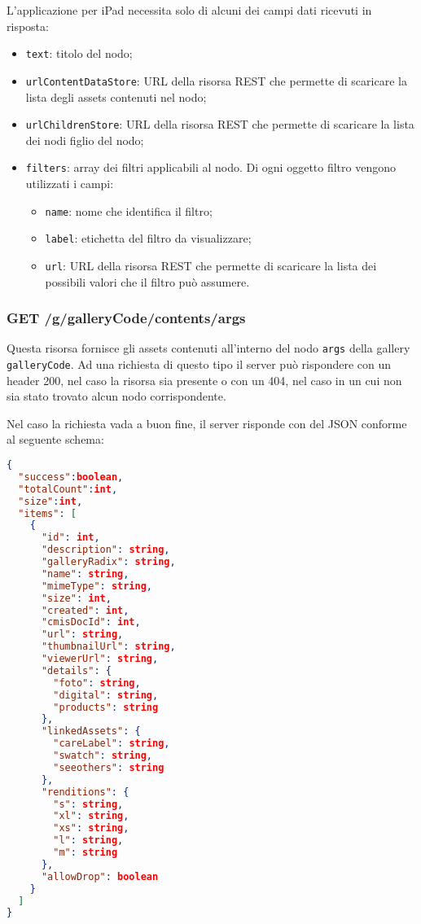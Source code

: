 L'applicazione per iPad necessita solo di alcuni dei campi dati ricevuti in risposta:
\begin{itemize}
\item \texttt{text}: titolo del nodo;
\item \texttt{urlContentDataStore}: URL della risorsa REST che permette di scaricare la lista degli assets contenuti nel nodo;
\item \texttt{urlChildrenStore}: URL della risorsa REST che permette di scaricare la lista dei nodi figlio del nodo;
\item \texttt{filters}: array dei filtri applicabili al nodo. Di ogni oggetto filtro vengono utilizzati i campi:
	\begin{itemize}
	\item \texttt{name}: nome che identifica il filtro;
	\item \texttt{label}: etichetta del filtro da visualizzare;
	\item \texttt{url}: URL della risorsa REST che permette di scaricare la lista dei possibili valori che il filtro può assumere.
	\end{itemize}
\end{itemize}

\subsubsection{GET /g/{galleryCode}/contents/{args}}

Questa risorsa fornisce gli assets contenuti all'interno del nodo \texttt{args} della gallery \texttt{galleryCode}.
Ad una richiesta di questo tipo il server può rispondere con un header 200, nel caso la risorsa sia presente o con un 404, nel caso in un cui non sia stato trovato alcun nodo corrispondente.

Nel caso la richiesta vada a buon fine, il server risponde con del JSON conforme al seguente schema:
\begin{lstlisting}[language=JSON, caption=JSON Schema di GET /g/{galleryCode}/contents/{args}]
{
  "success":boolean,
  "totalCount":int,
  "size":int,
  "items": [
    {
      "id": int,
      "description": string,
      "galleryRadix": string,
      "name": string,
      "mimeType": string,
      "size": int,
      "created": int,
      "cmisDocId": int,
      "url": string,
      "thumbnailUrl": string,
      "viewerUrl": string,
      "details": {
        "foto": string,
        "digital": string,
        "products": string
      },
      "linkedAssets": {
        "careLabel": string,
        "swatch": string,
        "seeothers": string
      },
      "renditions": {
        "s": string,
        "xl": string,
        "xs": string,
        "l": string,
        "m": string
      },
      "allowDrop": boolean
    }
  ]
}
\end{lstlisting}
\FloatBarrier


